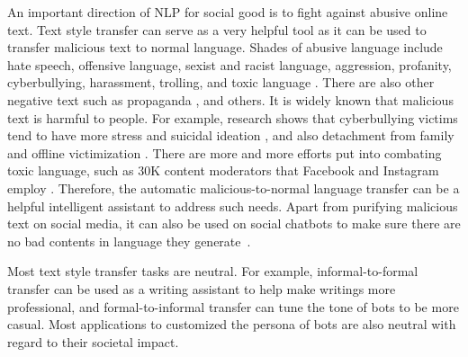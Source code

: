 An important direction of NLP for social good is to fight against abusive online text. Text style transfer can serve as a very helpful tool as it can be used to transfer malicious text to normal language. Shades of abusive language include hate speech, offensive language, sexist and racist language, aggression, profanity, cyberbullying, harassment, trolling, and toxic language . There are also other negative text such as propaganda , and others. It is widely known that malicious text is harmful to people. For example, research shows that cyberbullying victims tend to have more stress and suicidal ideation , and also detachment from family and offline victimization . There are more and more efforts put into combating toxic language, such as 30K content moderators that Facebook and Instagram employ   . Therefore, the automatic malicious-to-normal language transfer can be a helpful intelligent assistant to address such needs. Apart from purifying malicious text on social media, it can also be used on social chatbots to make sure there are no bad contents in language they generate~.

Most text style transfer tasks are neutral. For example, informal-to-formal transfer can be used as a writing assistant to help make writings more professional, and formal-to-informal transfer can tune the tone of bots to be more casual. Most applications to customized the persona of bots are also neutral with regard to their societal impact.

